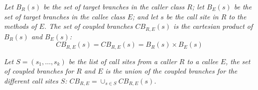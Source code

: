 \begin{definition}
\textit{
Let $B_{R}(s)$ be the set of target branches in the caller class $R$; let $B_{E}(s)$ be the set of target branches in the callee class $E$; and let $s$ be the call site in $R$ to the methods of $E$. The set of coupled branches $CB_{R,E}(s)$ is the cartesian product of $B_{R}(s)$ and $B_{E}(s)$:
}
\begin{equation}\label{def2}
	CB_{R,E}(s) = CB_{R,E}(s) = B_{R}(s) \times B_{E}(s)
\end{equation}
\end{definition}

\begin{definition}\textit{\label{def3}
Let $S=(s_1, \dots, s_k)$ be the list of call sites from a caller $R$ to a callee $E$, the set of coupled branches for $R$ and $E$ is the union of the coupled branches for the different call sites $S$: $CB_{R,E} = \cup_{s \in S} CB_{R,E}(s)$.
}
\end{definition}

%
%
%

